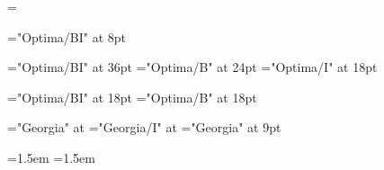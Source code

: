 \def\displayfontname{Optima}
\def\bodyfontname{Georgia}
\newdimen\bodyfontsize \bodyfontsize=12pt
\newdimen\leading \leading=15pt
\normalbaselineskip=\leading

\def\makefont#1#2#3#4{\font#1="#2#4" at #3}

\def\makebodyfont#1#2{\makefont{#1}{\bodyfontname}{\bodyfontsize}{#2}}

\def\makedisplayfont#1#2#3{\makefont{#1}{\displayfontname}{#2}{#3}}

\makedisplayfont{\pageheaderfont}{8pt}{/BI}
\def\pagefooterfont{\pageheaderfont}

\makedisplayfont{\titlepagetitlefont}{36pt}{/BI}
\makedisplayfont{\titlepageauthorfont}{24pt}{/B}
\makedisplayfont{\titlepagepublisherfont}{18pt}{/I}

\makedisplayfont{\infopagetitlefont}{18pt}{/BI}
\makedisplayfont{\sectiontitlefont}{18pt}{/B}

\makebodyfont{\bodyrm}{}
\makebodyfont{\bodyit}{/I}
\makefont{\colophonfont}{\bodyfontname}{9pt}{}

\def\leadin#1{{\leadinstyle#1}}
\def\leadinstyle{\noindent\bodyit}

\def\emph#1{{\bodyit #1}}

\normalbaselines
\raggedbottom
\bodyrm
\emergencystretch=1.5em
\parindent=1.5em
